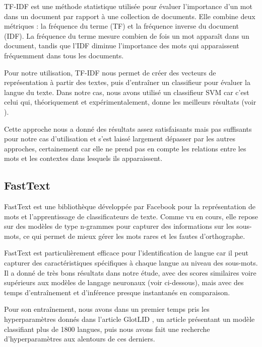 TF-IDF est une méthode statistique utilisée pour évaluer l'importance d'un mot dans un document par rapport à une collection de documents. Elle combine deux métriques : la fréquence du terme (TF) et la fréquence inverse du document (IDF). La fréquence du terme mesure combien de fois un mot apparaît dans un document, tandis que l'IDF diminue l'importance des mots qui apparaissent fréquemment dans tous les documents.

Pour notre utilisation, TF-IDF nous permet de créer des vecteurs de représentation à partir des textes, puis d'entraîner un classifieur pour évaluer la langue du texte. Dans notre cas, nous avons utilisé un classifieur SVM car c'est celui qui, théoriquement et expérimentalement, donne les meilleurs résultats (voir \cite{baldwin2010language}).

Cette approche nous a donné des résultats assez satisfaisants mais pas suffisants pour notre cas d'utilisation et s'est laissé largement dépasser par les autres approches, certainement car elle ne prend pas en compte les relations entre les mots et les contextes dans lesquels ils apparaissent.

\subsection{FastText}

FastText est une bibliothèque développée par Facebook \cite{joulin2017bag} pour la représentation de mots et l'apprentissage de classificateurs de texte. Comme vu en cours, elle repose sur des modèles de type n-grammes pour capturer des informations sur les sous-mots, ce qui permet de mieux gérer les mots rares et les fautes d'orthographe.

FastText est particulièrement efficace pour l'identification de langue car il peut capturer des caractéristiques spécifiques à chaque langue au niveau des sous-mots. Il a donné de très bons résultats dans notre étude, avec des scores similaires voire supérieurs aux modèles de langage neuronaux (voir ci-dessous), mais avec des temps d'entraînement et d'inférence presque instantanés en comparaison.

Pour son entraînement, nous avons dans un premier temps pris les hyperparamètres donnés dans l'article GlotLID \cite{Kargaran_2023}, un article présentant un modèle classifiant plus de 1800 langues, puis nous avons fait une recherche d'hyperparamètres aux alentours de ces derniers. 

